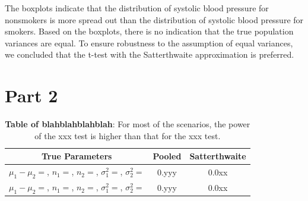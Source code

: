 \documentclass[]{article}
\begin{document}
The boxplots indicate that the distribution of systolic blood pressure
for nonsmokers is more spread out than the distribution of systolic
blood pressure for smokers. Based on the boxplots, there is no
indication that the true population variances are equal. To ensure
robustness to the assumption of equal variances, we concluded that the
t-test with the Satterthwaite approximation is preferred.

\section{Part 2}\label{s:part2}

\begin{table}[H]\begin{center}
\caption{{\bf Table of blahblahblahblah}: For most of the scenarios, the power of the xxx test is higher than that for the xxx test.}\label{t:power}
\begin{tabular}{c|cc} \hline
True Parameters & Pooled & Satterthwaite \\ \hline
$\mu_1-\mu_2=$, $n_1=$, $n_2=$, $\sigma_1^2=$, $\sigma_2^2=$ & 0.yyy & 0.0xx  \\
$\mu_1-\mu_2=$, $n_1=$, $n_2=$, $\sigma_1^2=$, $\sigma_2^2=$ & 0.yyy & 0.0xx \\ \hline
\end{tabular}
\end{center}
\end{table}
\end{document}
